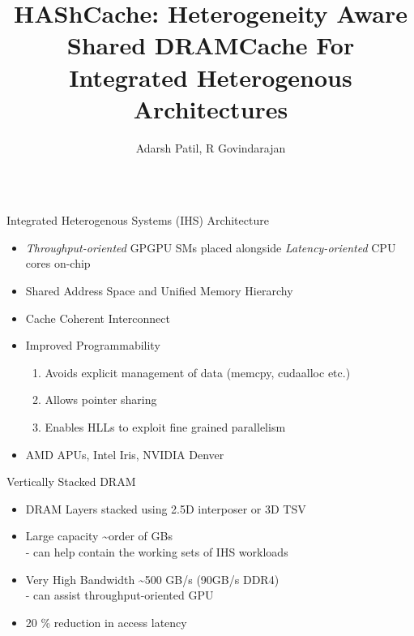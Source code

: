 \documentclass[final,t]{beamer}
\title{\LARGE HAShCache: Heterogeneity Aware Shared DRAMCache For Integrated Heterogenous Architectures}
\author{Adarsh Patil, R Govindarajan}
\institute{Department of CSA, Indian Institute of Science, Bangalore }
\begin{document}


\begin{frame}[t,fragile]{}
\begin{columns}[t]

\begin{column}{.47\linewidth}

    \begin{exampleblock}{Integrated Heterogenous Systems (IHS) Architecture}
    \begin{itemize}
    	\item \textit{Throughput-oriented} GPGPU SMs placed alongside \textit{Latency-oriented} CPU cores on-chip
   		\item Shared Address Space and Unified Memory Hierarchy 
		\item Cache Coherent Interconnect
    	\item Improved Programmability
    	\begin{enumerate}
	    	\item Avoids explicit management of data (memcpy, cudaalloc etc.)
	    	\item Allows pointer sharing
	    	\item Enables HLLs to exploit fine grained parallelism
    	\end{enumerate}
		\item AMD APUs, Intel Iris, NVIDIA Denver
    \end{itemize}
    \end{exampleblock}
    \begin{exampleblock}{Vertically Stacked DRAM}
    \begin{itemize}
        	\item DRAM Layers stacked using 2.5D interposer or 3D TSV
       		\item Large capacity \textasciitilde order of GBs \\
       				\qquad - can help contain the working sets of IHS workloads
    		\item Very High Bandwidth \textasciitilde 500 GB/s (90GB/s DDR4)\\
    				\qquad - can assist throughput-oriented GPU
    		\item 20 \% reduction in access latency \\

\end{itemize}
\end{exampleblock}
\end{column}
\end{columns}
\end{frame}
\end{document}
